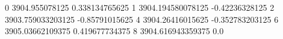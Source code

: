 0 3904.955078125 0.338134765625
1 3904.194580078125 -0.42236328125
2 3903.759033203125 -0.85791015625
4 3904.26416015625 -0.352783203125
6 3905.03662109375 0.419677734375
8 3904.616943359375 0.0

